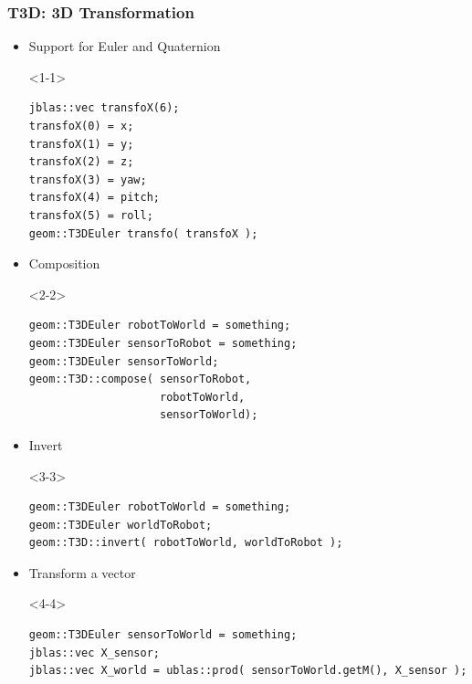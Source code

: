 \documentclass[pdf]{beamer}
\begin{document}
\begin{frame}[fragile]
  \frametitle{T3D: 3D Transformation}
  \begin{itemize}
    \item<1-> Support for Euler and Quaternion
      \begin{onlyenv}<1-1>
        \begin{lstlisting}
jblas::vec transfoX(6);
transfoX(0) = x;
transfoX(1) = y;
transfoX(2) = z;
transfoX(3) = yaw;
transfoX(4) = pitch;
transfoX(5) = roll;
geom::T3DEuler transfo( transfoX );
        \end{lstlisting}
      \end{onlyenv}
    \item<2-> Composition
      \begin{onlyenv}<2-2>
        \begin{lstlisting}
geom::T3DEuler robotToWorld = something;
geom::T3DEuler sensorToRobot = something;
geom::T3DEuler sensorToWorld;
geom::T3D::compose( sensorToRobot, 
                    robotToWorld,
                    sensorToWorld);
        \end{lstlisting}
      \end{onlyenv}
    \item<3-> Invert
      \begin{onlyenv}<3-3>
        \begin{lstlisting}
geom::T3DEuler robotToWorld = something;
geom::T3DEuler worldToRobot;
geom::T3D::invert( robotToWorld, worldToRobot );
        \end{lstlisting}
      \end{onlyenv}
    \item<4-> Transform a vector
      \begin{onlyenv}<4-4>
        \begin{lstlisting}
geom::T3DEuler sensorToWorld = something;
jblas::vec X_sensor;
jblas::vec X_world = ublas::prod( sensorToWorld.getM(), X_sensor );
        \end{lstlisting}
      \end{onlyenv}
    
  \end{itemize}
\end{frame}

\end{document}
